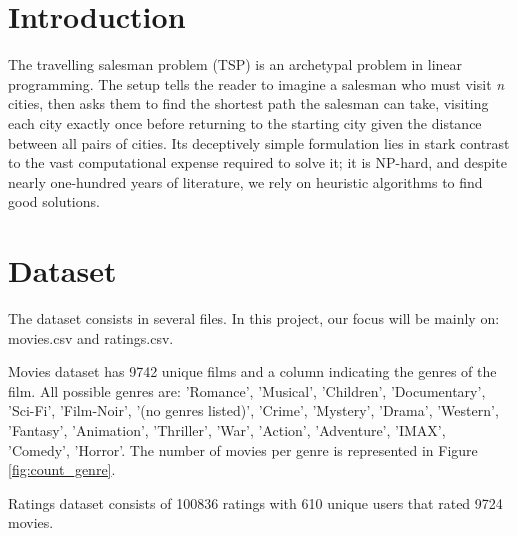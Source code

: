 \documentclass[12pt]{article}
\numberwithin{equation}{section}
\begin{document}
\newpage

\section{Introduction}

The travelling salesman problem (TSP) is an archetypal problem in linear programming. The setup tells the reader to imagine a salesman who must visit \textit{n} cities, then asks them to find the shortest path the salesman can take, visiting each city exactly once before returning to the starting city given the distance between all pairs of cities. Its deceptively simple formulation lies in stark contrast to the vast computational expense required to solve it; it is NP-hard, and despite nearly one-hundred years of literature, we rely on heuristic algorithms to find good solutions. 

\section{Dataset}

The dataset consists in several files. In this project, our focus will be mainly on: movies.csv and ratings.csv. 

Movies dataset has 9742 unique films and a column indicating the genres of the film. All possible genres are: 'Romance', 'Musical', 'Children', 'Documentary', 'Sci-Fi', 'Film-Noir', '(no genres listed)', 'Crime', 'Mystery', 'Drama', 'Western', 'Fantasy', 'Animation', 'Thriller', 'War', 'Action', 'Adventure', 'IMAX', 'Comedy', 'Horror'. The number of movies per genre is represented in Figure \ref{fig:count_genre}.

Ratings dataset consists of 100836 ratings with 610 unique users that rated 9724 movies. 

\begin{figure}[h!]
 \end{figure}
\end{document}
